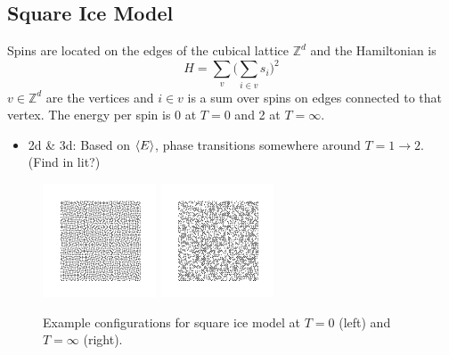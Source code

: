 \documentclass[11pt]{article}
\begin{document}
\subsection{Square Ice Model}
Spins are located on the edges of the cubical lattice $\mathbb{Z}^d$ and the Hamiltonian is
\begin{equation}
    H = \sum_v\Big(\sum_{i\in v}s_i\Big)^2
\end{equation}
$v\in\mathbb{Z}^d$ are the vertices and $i\in v$ is a sum over spins on edges connected to that vertex. The energy per spin is 0 at $T=0$ and 2 at $T=\infty$.
\begin{itemize}
    \item 2d \& 3d: Based on $\ev{E}$, phase transitions somewhere around $T=1\to2$. (Find in lit?)
\end{itemize}
\begin{figure}[h]
    \centering
    \includegraphics[width=0.3\textwidth]{squareice_images/squareice_T=0.png}
    \includegraphics[width=0.3\textwidth]{squareice_images/squareice_T=inf.png}
    \caption{Example configurations for square ice model at $T=0$ (left) and $T=\infty$ (right).}
\end{figure}
\end{document}

